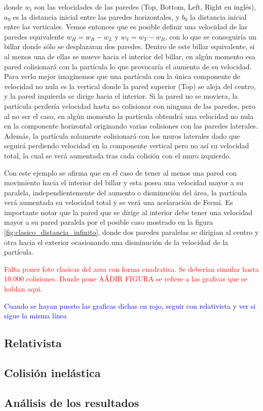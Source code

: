 \documentclass[11pt, spanish]{book}
\begin{document}
donde \( w_i \) son las velocidades de las paredes (Top, Bottom, Left, Right en inglés), \( a_0 \) es la distancia inicial entre las paredes horizontales, y \( b_0 \) la distancia inicial entre las verticales. Vemos entonces que es posible definir una velocidad de las paredes equivalente \( w_H =  w_R - w_L \) y \( w_V = w_T - w_B \), con lo que se conseguiría un billar donde sólo se desplazaran dos paredes. Dentro de este billar equivalente, si al menos una de ellas se mueve hacia el interior del billar, en algún momento esa pared colisionará con la partícula lo que provocaría el aumento de su velocidad. Para verlo mejor imaginemos que una partícula con la única componente de velocidad no nula es la vertical donde la pared superior (Top) se aleja del centro, y la pared izquierda se dirige hacia el interior. Si la pared no se moviera, la partícula perdería velocidad hasta no colisionar con ninguna de las paredes, pero al no ser el caso, en algún momento la partícula obtendrá una velocidad no nula en la componente horizontal originando varias colisiones con las paredes laterales. Además, la partícula solamente colisionará con los muros laterales dado que seguirá perdiendo velocidad en la componente vertical pero no así su velocidad total, la cual se verá aumentada tras cada colisión con el muro izquierdo.

\vspace{3mm}

Con este ejemplo se afirma que en el caso de tener al menos una pared con movimiento hacia el interior del billar y esta posea una velocidad mayor a su paralela, independientemente del aumento o disminución del área, la partícula verá aumentada su velocidad total y se verá una acelaración de Fermi. Es importante notar que la pared que se dirige al interior debe tener una velocidad mayor a su pared paralela por el posible caso mostrado en la figura \ref{fig:clasico_distancia_infinito}, donde dos paredes paralelas se dirigian al centro y otra hacia el exterior ocasionando una disminución de la velocidad de la partícula.

\textcolor{red}{Falta poner foto clasicas del area con forma cuadratica. Se deberían simular hasta 10.000 colisiones. Donde pone AÁDIR FIGURA se refiere a las graficas que se hablan aqui.}

\textcolor{blue}{Cuando se hayan puesto las graficas dichas en rojo, seguir con relativista y ver si sigue la misma línea}

\subsection{Relativista}

\subsection{Colisión inelástica}

\subsection{Análisis de los resultados}
\end{document}
